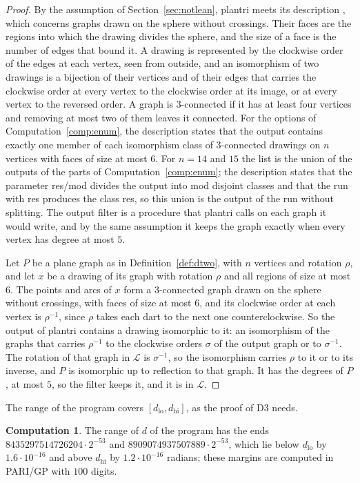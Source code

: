 \documentclass[12pt]{amsart}
\theoremstyle{definition}
\newtheorem{step}[theorem]{Computation}
\theoremstyle{plain}
\theoremstyle{definition}
\newcommand{\dlo}{d_{\mathrm{lo}}}
\newcommand{\dhi}{d_{\mathrm{hi}}}
\newcommand{\codemap}[1]{\ignorespaces}
\begin{document}
\begin{proof}
By the assumption of Section~\ref{sec:notlean}, plantri meets its description \cite{BM}, which concerns graphs drawn on the sphere without crossings. Their faces are the regions into which the drawing divides the sphere, and the size of a face is the number of edges that bound it. A drawing is represented by the clockwise order of the edges at each vertex, seen from outside, and an isomorphism of two drawings is a bijection of their vertices and of their edges that carries the clockwise order at every vertex to the clockwise order at its image, or at every vertex to the reversed order. A graph is 3-connected if it has at least four vertices and removing at most two of them leaves it connected. For the options of Computation~\ref{comp:enum}, the description states that the output contains exactly one member of each isomorphism class of 3-connected drawings on $n$ vertices with faces of size at most $6$. For $n=14$ and $15$ the list is the union of the outputs of the parts of Computation~\ref{comp:enum}; the description states that the parameter res/mod divides the output into mod disjoint classes and that the run with res produces the class res, so this union is the output of the run without splitting. The output filter is a procedure that plantri calls on each graph it would write, and by the same assumption it keeps the graph exactly when every vertex has degree at most $5$.

Let $P$ be a plane graph as in Definition~\ref{def:dtwo}, with $n$ vertices and rotation $\rho$, and let $x$ be a drawing of its graph with rotation $\rho$ and all regions of size at most $6$. The points and arcs of $x$ form a 3-connected graph drawn on the sphere without crossings, with faces of size at most $6$, and its clockwise order at each vertex is $\rho^{-1}$, since $\rho$ takes each dart to the next one counterclockwise. So the output of plantri contains a drawing isomorphic to it: an isomorphism of the graphs that carries $\rho^{-1}$ to the clockwise orders $\sigma$ of the output graph or to $\sigma^{-1}$. The rotation of that graph in $\mathcal L$ is $\sigma^{-1}$, so the isomorphism carries $\rho$ to it or to its inverse, and $P$ is isomorphic up to reflection to that graph. It has the degrees of $P$, at most $5$, so the filter keeps it, and it is in $\mathcal L$.
\end{proof}

The range of the program covers $[\dlo,\dhi]$, as the proof of D3 needs.

\begin{step}\label{comp:targets}\codemap{code/hyps/d_range.sh > code/hyps/d_range.out}
The range of $d$ of the program has the ends $8435297514726204\cdot2^{-53}$ and $8909074937507889\cdot2^{-53}$, which lie below $\dlo$ by $1.6\cdot10^{-16}$ and above $\dhi$ by $1.2\cdot10^{-16}$ radians; these margins are computed in PARI/GP with $100$ digits.
\end{step}
\end{document}
